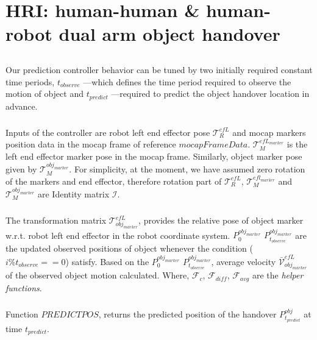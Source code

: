 \chapter{HRI: human-human \& human-robot dual arm object handover\newline}

\section*{}
Our prediction controller behavior can be tuned by two initially required constant time periods, $t_{observe}$ ---which defines the time period required to observe the motion of object and $t_{predict}$ ---required to predict the object handover location in advance.

\paragraph*{}
Inputs of the controller are robot left end effector pose $\mathcal{T}^{efL}_R$ and mocap markers position data in the mocap frame of reference $mocapFrameData$. $\mathcal{T}^{efL_{marker}}_M$ is the left end effector marker pose in the mocap frame. Similarly, object marker pose given by $\mathcal{T}^{obj_{marker}}_M$. For simplicity, at the moment, we have assumed zero rotation of the markers and end effector, therefore rotation part of $\mathcal{T}^{efL}_R$, $\mathcal{T}^{efl_{marker}}_M$ and $\mathcal{T}^{obj_{marker}}_M$ are Identity matrix $\mathcal{I}$. 

\paragraph*{}
The transformation matrix $\mathcal{T}^{efL}_{obj_{marker}}$, provides the relative pose of object marker w.r.t. robot left end effector in the robot coordinate system. $P^{obj_{marker}}_0$ $P^{obj_{marker}}_{t_{observe}}$ are the updated observed positions of object whenever the condition ($i\%t_{observe}==0$) satisfy. Based on the  $P^{obj_{marker}}_0$ $P^{obj_{marker}}_{t_{observe}}$, average velocity $\mathcal{\bar{V}}^{efL}_{obj_{marker}}$ of the observed object motion calculated. Where, $\mathcal{F}_c$, $\mathcal{F}_{diff}$, $\mathcal{F}_{avg}$ are the \textit{helper functions}.

\paragraph*{}
Function $PREDICTPOS$, returns the predicted position of the handover $P^{obj}_{t_{predict}}$ at time $t_{predict}$.


